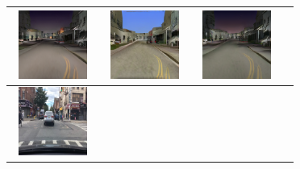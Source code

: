 \documentclass{VUMIFPSbakalaurinis}
\begin{document}
\begin{table}[H]
{\begin{tabular}{|c|c|c|c|}
            \includegraphics[width=100,height=85]{img/pvz/3_cycle_v2} & \includegraphics[width=100,height=85]{img/pvz/3_cut_v2} & \includegraphics[width=100,height=85]{img/pvz/3_mspc_v2}
            \\
            \hline
            \includegraphics[width=100,height=85]{img/pvz/4_real} & 

\end{tabular}}
\end{table}
\end{document}
